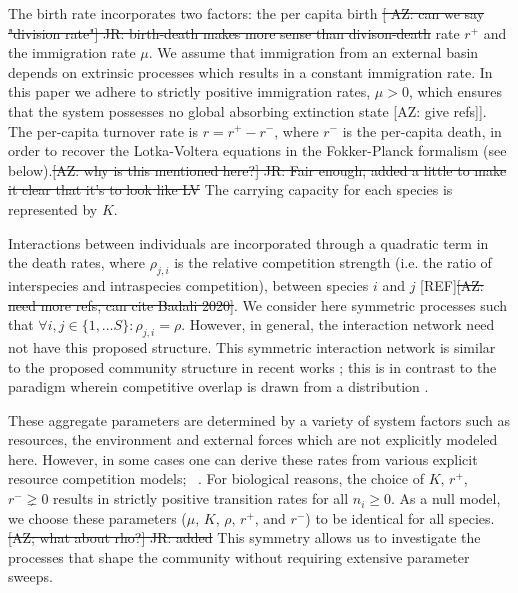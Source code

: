 \documentclass[9pt,twocolumn,twoside,lineno]{pnas-new}
\begin{document}
The birth rate incorporates two factors: the per capita birth \st{[ AZ: can we say "division rate"] JR: birth-death makes more sense than divison-death} rate $r^+$ and the immigration rate $\mu$.
We assume that immigration from an external basin depends on extrinsic processes which results in a constant immigration rate.
In this paper we adhere to strictly positive immigration rates, $\mu > 0$, which ensures that the system possesses no global absorbing extinction state [AZ: give refs]]. 
The per-capita turnover rate is $r=r^+-r^-$, where $r^-$ is the per-capita death, in order to recover the Lotka-Voltera equations in the Fokker-Planck formalism (see below).\st{[AZ: why is this mentioned here?] JR: Fair enough, added a little to make it clear that it's to look like LV}
The carrying capacity for each species is represented by $K$.

Interactions between individuals are incorporated through a quadratic term in the death rates, where $\rho_{j,i}$ is the relative competition strength (i.e. the ratio of interspecies and intraspecies competition), between species $i$ and $j$ \cite{haegeman2011mathematical, badali2020effects}[REF]\st{[AZ: need more refs, can cite Badali 2020]}.
We consider here symmetric processes such that $\forall i,j\in \{1,\dots S\}:\rho_{j,i}=\rho$. 
However, in general, the interaction network need not have this proposed structure.
This symmetric interaction network is similar to the proposed community structure in recent works \cite{capitan2017stochastic,capitan2020competitive,haegeman2011mathematical}; this is in contrast to the paradigm wherein competitive overlap is drawn from a distribution \cite{fisher2014transition,allesina2012stability}.

These aggregate  parameters are determined by a variety of system factors such as resources, the environment and external forces which are not explicitly modeled here.
However, in some cases one can derive these rates from various explicit resource competition models; %
~\cite{macArthur1970species,chesson1990macarthur,o2018whence}.
For biological reasons, the choice of $K$, $r^+$, $r^- \gneq 0$ results in strictly positive transition rates for all $ n_i\geq 0$.
As a null model, we choose these parameters ($\mu$, $K$, $\rho$, $r^+$, and $r^-$) to be identical for all species.\st{[AZ; what about rho?] JR: added}
This symmetry allows us to investigate the processes that shape the community without requiring extensive parameter sweeps.
\end{document}
